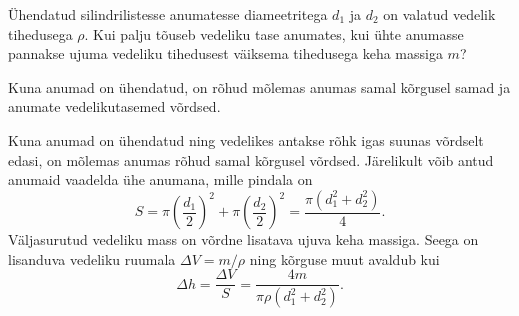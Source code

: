 
Ühendatud silindrilistesse anumatesse diameetritega $d_1$ ja $d_2$ on valatud vedelik tihedusega $\rho$. Kui palju tõuseb vedeliku tase anumates, kui ühte anumasse pannakse ujuma vedeliku tihedusest väiksema tihedusega keha massiga $m$?

\hint
Kuna anumad on ühendatud, on rõhud mõlemas anumas samal kõrgusel samad ja anumate vedelikutasemed võrdsed.

\solu
Kuna anumad on ühendatud ning vedelikes antakse rõhk igas suunas võrdselt edasi, on mõlemas anumas rõhud samal kõrgusel võrdsed. Järelikult võib antud anumaid vaadelda ühe anumana, mille pindala on
\[
S=\pi\left(\frac{d_{1}}{2}\right)^{2}+\pi\left(\frac{d_{2}}{2}\right)^{2}=\frac{\pi\left(d_{1}^{2}+d_{2}^{2}\right)}{4}.
\]
Väljasurutud vedeliku mass on võrdne lisatava ujuva keha massiga. Seega on lisanduva vedeliku ruumala $\Delta V = m/\rho$ ning kõrguse muut avaldub kui
\[
\Delta h=\frac{\Delta V}{S}=\frac{4 m}{\pi \rho\left(d_{1}^{2}+d_{2}^{2}\right)}.
\]
\probend
